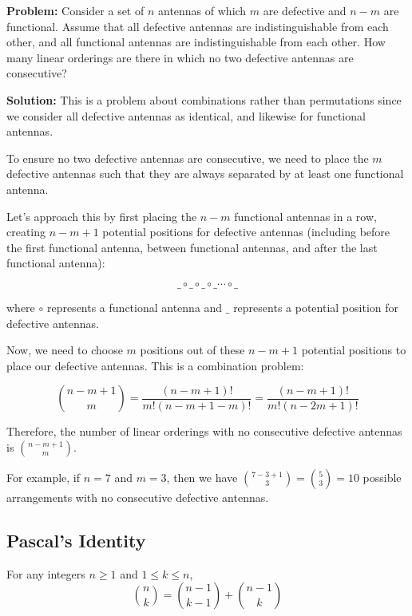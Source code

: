 \begin{examplebox}[title=Example: Antennas with No Consecutive Defectives]
    \textbf{Problem:} Consider a set of $n$ antennas of which $m$ are defective and $n-m$ are functional. Assume that all defective antennas are indistinguishable from each other, and all functional antennas are indistinguishable from each other. How many linear orderings are there in which no two defective antennas are consecutive?
    
    \textbf{Solution:} This is a problem about combinations rather than permutations since we consider all defective antennas as identical, and likewise for functional antennas.
    
    To ensure no two defective antennas are consecutive, we need to place the $m$ defective antennas such that they are always separated by at least one functional antenna.
    
    Let's approach this by first placing the $n-m$ functional antennas in a row, creating $n-m+1$ potential positions for defective antennas (including before the first functional antenna, between functional antennas, and after the last functional antenna):
    
    \[
    \_ \circ \_ \circ \_ \circ \_ \cdots \circ \_
    \]
    
    where $\circ$ represents a functional antenna and $\_$ represents a potential position for defective antennas.
    
    Now, we need to choose $m$ positions out of these $n-m+1$ potential positions to place our defective antennas. This is a combination problem:
    
    \[
    \binom{n-m+1}{m} = \frac{(n-m+1)!}{m!(n-m+1-m)!} = \frac{(n-m+1)!}{m!(n-2m+1)!}
    \]
    
    Therefore, the number of linear orderings with no consecutive defective antennas is $\binom{n-m+1}{m}$.
    
    For example, if $n=7$ and $m=3$, then we have $\binom{7-3+1}{3} = \binom{5}{3} = 10$ possible arrangements with no consecutive defective antennas.
\end{examplebox}

\subsection{Pascal's Identity}
\begin{theorembox}[title=Pascal's Identity]
    For any integers \(n \geq 1\) and \(1 \leq k \leq n\),
    \[
    \binom{n}{k} = \binom{n-1}{k-1} + \binom{n-1}{k}
    \]
\end{theorembox}
